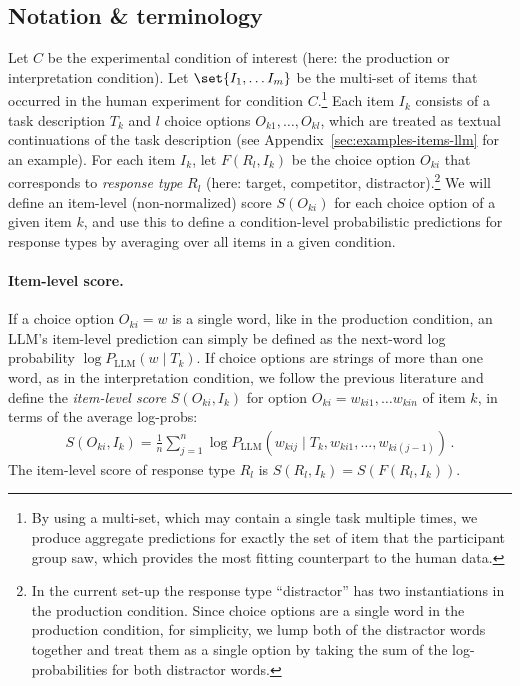 \documentclass{article}
\begin{document}
\subsection{Notation \& terminology}
\label{sec:notat--term}

Let $C$ be the experimental condition of interest (here: the production or interpretation condition).
Let \(\set{I_1, \dots I_m}\) be the multi-set of items that occurred in the human experiment for condition $C$.\footnote{
  By using a multi-set, which may contain a single task multiple times, we produce aggregate predictions for exactly the set of item that the participant group saw, which provides the most fitting counterpart to the human data.
}
Each item $I_{k}$ consists of a task description $T_{k}$ and $l$ choice options $O_{k1}, \dots, O_{kl}$, which are treated as textual continuations of the task description (see Appendix~\ref{sec:examples-items-llm} for an example).
For each item $I_{k}$, let $F(R_{l}, I_{k})$ be the choice option $O_{ki}$ that corresponds to \emph{response type} $R_{l}$ (here: target, competitor, distractor).\footnote{In the current set-up the response type ``distractor'' has two instantiations in the production condition. Since choice options are a single word in the production condition, for simplicity, we lump both of the distractor words together and treat them as a single option by taking the sum of the log-probabilities for both distractor words.}
We will define an item-level (non-normalized) score $S(O_{ki})$ for each choice option of a given item $k$, and use this to define a condition-level probabilistic predictions for response types by averaging over all items in a given condition.

\paragraph{Item-level score.}
If a choice option $O_{ki} = w$ is a single word, like in the production condition, an LLM's item-level prediction can simply be defined as the next-word log probability $\log P_{\text{LLM}} (w \mid T_{k})$.
If choice options are strings of more than one word, as in the interpretation condition, we follow the previous literature \citep[e.g.,][]{BrownMann2020:Language-Models} and define the \emph{item-level score} $S(O_{{ki}}, I_{k})$ for option $O_{ki} = w_{ki1}, \dots w_{kin}$ of item $k$, in terms of the average log-probs:
%
\begin{align*}
S(O_{ki}, I_{k}) =  \frac{1}{n} \sum_{j=1}^n \log P_{\text{LLM}} \left(w_{kij} \mid T_{k}, w_{ki1}, \dots, w_{ki(j-1)} \right)  \,.
\end{align*}
%
The item-level score of response type $R_{l}$ is $S(R_{l}, I_{k}) = S(F(R_{l}, I_{k}))$.
\end{document}

